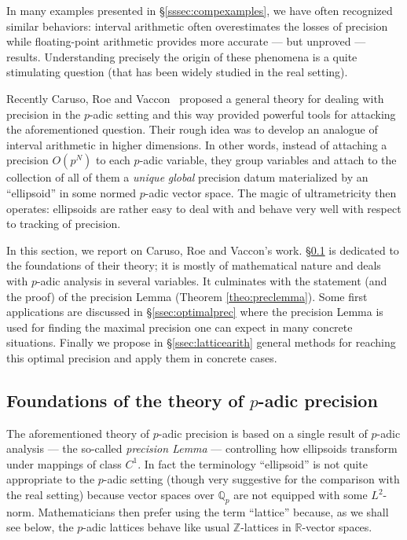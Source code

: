 \documentclass[11pt]{article}
\numberwithin{equation}{section}
\numberwithin{figure}{section}
\theoremstyle{definition}
\newcommand{\Z}{\mathbb Z}
\newcommand{\Q}{\mathbb Q}
\newcommand{\Qp}{\Q_p}
\newcommand{\R}{\mathbb R}
\begin{document}
In many examples presented in \S \ref{sssec:compexamples}, we have often 
recognized similar behaviors: interval arithmetic often overestimates 
the losses of precision while floating-point arithmetic provides more 
accurate --- but unproved --- results. Understanding precisely the
origin of these phenomena is a quite stimulating question (that has
been widely studied in the real setting).

Recently Caruso, Roe and Vaccon~\cite{CaRoVa14} proposed a general theory for 
dealing with precision in the $p$-adic setting and this way provided
powerful tools for attacking the aforementioned question. Their rough 
idea was to develop an analogue of interval arithmetic in higher 
dimensions. In other words, instead of attaching a precision $O(p^N)$ to 
each $p$-adic variable, they group variables and attach to the 
collection of all of them a \emph{unique} \emph{global} precision datum 
materialized by an ``ellipsoid'' in some normed $p$-adic vector space. 
The magic of ultrametricity then operates: ellipsoids are rather easy to 
deal with and behave very well with respect to tracking of precision.

In this section, we report on Caruso, Roe and Vaccon's work. 
\S \ref{ssec:foundpadicprec} is dedicated to the foundations of their 
theory; it is mostly of mathematical nature and deals with $p$-adic 
analysis in several variables. It culminates with the statement (and
the proof) of the precision Lemma (Theorem \ref{theo:preclemma}).
Some first applications are discussed in \S \ref{ssec:optimalprec}
where the precision Lemma is used for finding the maximal precision
one can expect in many concrete situations. Finally we propose in
\S \ref{ssec:latticearith} general methods for reaching this optimal 
precision and apply them in concrete cases.

\subsection{Foundations of the theory of $p$-adic precision}
\label{ssec:foundpadicprec}

The aforementioned theory of $p$-adic precision is based on a single 
result of $p$-adic analysis --- the so-called \emph{precision Lemma} --- 
controlling how ellipsoids transform under mappings of class $C^1$. In 
fact the terminology ``ellipsoid'' is not quite appropriate to the 
$p$-adic setting (though very suggestive for the comparison with the 
real setting) because vector spaces over $\Qp$ are not equipped with 
some $L^2$-norm. Mathematicians then prefer using the term ``lattice'' 
because, as we shall see below, the $p$-adic lattices behave like usual 
$\Z$-lattices in $\R$-vector spaces.
\end{document}
